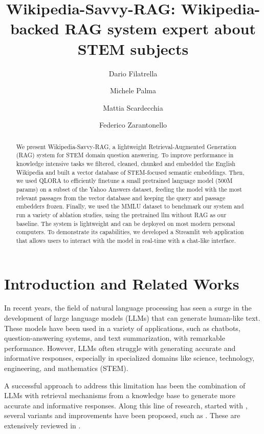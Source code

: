 \documentclass[11pt]{article}
\title{Wikipedia-Savvy-RAG: Wikipedia-backed RAG system expert about STEM subjects}
\author{Dario Filatrella \and Michele Palma \and Mattia Scardecchia \and Federico Zarantonello}
\begin{document}
\maketitle
\begin{abstract}
We present Wikipedia-Savvy-RAG, a lightweight Retrieval-Augmented Generation (RAG) system for
STEM domain question answering. To improve performance in knowledge intensive tasks we filtered, cleaned, 
chunked and embedded the English Wikipedia and built a vector database of STEM-focused semantic embeddings. 
Then, we used QLORA to efficiently finetune a small pretrained language model 
(500M params) on a subset of the Yahoo Answers dataset, feeding the model with the most relevant passages from the 
vector database and keeping the query and passage embedders frozen. Finally, we used the MMLU dataset to 
benchmark our system and run a variety of ablation studies, using the pretrained llm without RAG as our baseline.
The system is lightweight and can be deployed on most modern personal computers. To demonstrate its capabilities,
we developed a Streamlit web application that allows users to interact with the model in real-time with a chat-like interface.

\end{abstract}

\section{Introduction and Related Works}

In recent years, the field of natural language processing has seen a surge in
the development of large language models (LLMs) that can generate human-like text. \cite{gpt3}
These models have been used in a variety of applications, such as chatbots,
question-answering systems, and text summarization, with remarkable performance.  \cite{nlp_applications}
However, LLMs often struggle with generating accurate and informative responses, especially in specialized
domains like science, technology, engineering, and mathematics (STEM).  \cite{hallucinations_llm}

A successful approach to address this limitation has been the combination of LLMs with retrieval
mechanisms from a knowledge base to generate more accurate and informative responses.
Along this line of research, started with \cite{rag_paper}, several variants and improvements have been proposed,
such as \cite{replug} \cite{radit}. These are extensively reviewed in \cite{rag_survey}.
\end{document}
